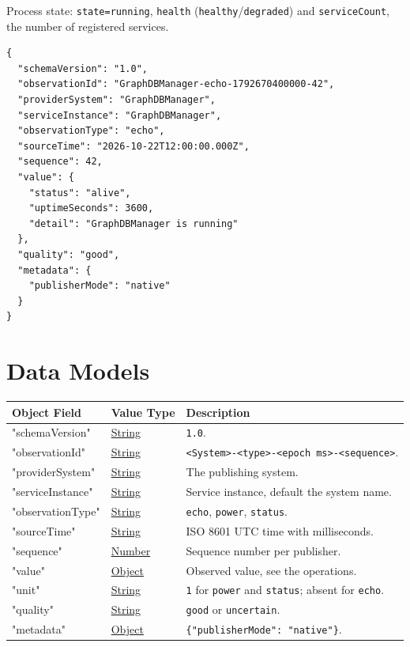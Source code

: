 \documentclass[a4paper]{arrowhead}
\newcommand{\oref}[1]{{\textcolor{ArrowheadBlue}{\hyperref[sec:operations:#1]{#1}}}}
\newcommand{\pref}[1]{{\textcolor{ArrowheadGrey}{\hyperref[sec:model:primitives:#1]{#1}}}}
\begin{document}
Process state: \texttt{state=\allowbreak{}running}, \texttt{health} (\texttt{healthy}/\texttt{degraded}) and \texttt{serviceCount}, the number of registered services.

\begin{lstlisting}[caption={An \oref{echo} observation.}]
{
  "schemaVersion": "1.0",
  "observationId": "GraphDBManager-echo-1792670400000-42",
  "providerSystem": "GraphDBManager",
  "serviceInstance": "GraphDBManager",
  "observationType": "echo",
  "sourceTime": "2026-10-22T12:00:00.000Z",
  "sequence": 42,
  "value": {
    "status": "alive",
    "uptimeSeconds": 3600,
    "detail": "GraphDBManager is running"
  },
  "quality": "good",
  "metadata": {
    "publisherMode": "native"
  }
}
\end{lstlisting}

\newpage

\section{Data Models}
\label{sec:model}


\noindent\begin{tabularx}{\textwidth}{| p{4.25cm} | p{3.5cm} | X |} \hline
\rowcolor{gray!33} Object Field & Value Type & Description \\ \hline
"schemaVersion" & \pref{String} & \texttt{1.0}. \\ \hline
"observationId" & \pref{String} & \texttt{<System>-<type>-<epoch ms>-<sequence>}. \\ \hline
"providerSystem" & \pref{String} & The publishing system. \\ \hline
"serviceInstance" & \pref{String} & Service instance, default the system name. \\ \hline
"observationType" & \pref{String} & \texttt{echo}, \texttt{power}, \texttt{status}. \\ \hline
"sourceTime" & \pref{String} & ISO 8601 UTC time with milliseconds. \\ \hline
"sequence" & \pref{Number} & Sequence number per publisher. \\ \hline
"value" & \pref{Object} & Observed value, see the operations. \\ \hline
"unit" & \pref{String} & \texttt{1} for \texttt{power} and \texttt{status}; absent for \texttt{echo}. \\ \hline
"quality" & \pref{String} & \texttt{good} or \texttt{uncertain}. \\ \hline
"metadata" & \pref{Object} & \texttt{\{"publisherMode": "native"\}}. \\ \hline
\end{tabularx}
\end{document}
